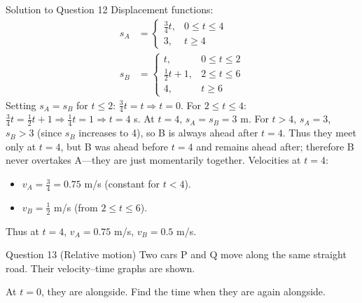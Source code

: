 \documentclass{beamer}
\begin{document}
\begin{frame}[shrink=15]{Solution to Question 12}
Displacement functions:
\begin{align*}
    s_A &= 
    \begin{cases}
        \frac{3}{4}t, & 0 \le t \le 4 \\
        3, & t \ge 4
    \end{cases} \\
    s_B &= 
    \begin{cases}
        t, & 0 \le t \le 2 \\
        \frac12 t + 1, & 2 \le t \le 6 \\
        4, & t \ge 6
    \end{cases}
\end{align*}
Setting $s_A = s_B$ for $t \le 2$: $\frac34 t = t \Rightarrow t=0$.
For $2 \le t \le 4$: $\frac34 t = \frac12 t + 1 \Rightarrow \frac14 t = 1 \Rightarrow t=4$ s.
At $t=4$, $s_A = s_B = 3$ m.
For $t > 4$, $s_A = 3$, $s_B > 3$ (since $s_B$ increases to 4), so B is always ahead after $t=4$. Thus they meet only at $t=4$, but B was ahead before $t=4$ and remains ahead after; therefore B never overtakes A—they are just momentarily together. Velocities at $t=4$:
\begin{itemize}
    \item $v_A = \frac{3}{4} = 0.75$ m/s (constant for $t<4$).
    \item $v_B = \frac12$ m/s (from $2 \le t \le 6$).
\end{itemize}
Thus at $t=4$, $v_A = 0.75$ m/s, $v_B = 0.5$ m/s.
\end{frame}

\begin{frame}[shrink=15]{Question 13 (Relative motion)}
Two cars P and Q move along the same straight road. Their velocity–time graphs are shown.
\begin{center}
\end{center}
At $t=0$, they are alongside. Find the time when they are again alongside.
\end{frame}
\end{document}

